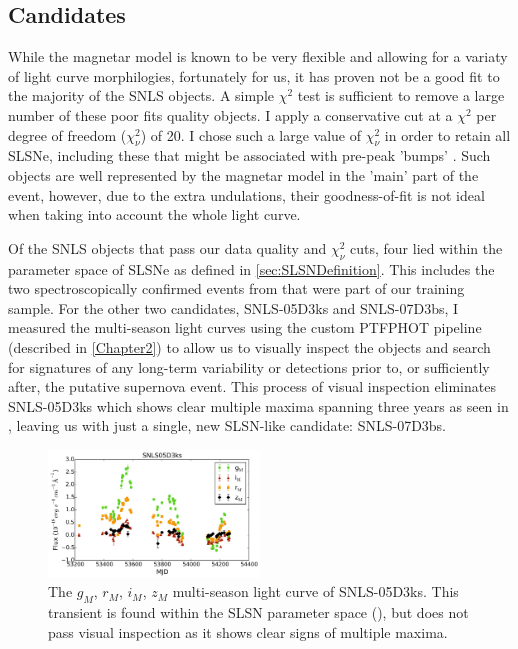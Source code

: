 \subsection{Candidates}
\label{sec:SLSNCands}
While the magnetar model is known to be very flexible and allowing for a variaty of light curve morphilogies, fortunately for us, it has proven not be a good fit to the majority of the SNLS objects. A simple $\chi^2$ test is sufficient to remove a large number of these poor fits quality objects. I apply a conservative cut at a $\chi^2$ per degree of freedom ($\chi^2_{\nu}$) of 20. I chose such a large value of $\chi^2_{\nu}$ in order to retain all SLSNe, including these that might be associated with pre-peak 'bumps' \citep{Nicolls2016,Nicolls2015a,Smith2016}. Such objects are well represented by the magnetar model in the 'main' part of the event, however, due to the extra undulations, their goodness-of-fit is not ideal when taking into account the whole light curve.

Of the SNLS objects that pass our data quality and $\chi^2_{\nu}$ cuts, four lied within the parameter space of SLSNe as defined in \ref{sec:SLSNDefinition}. This includes the two spectroscopically confirmed events from \citet{Howell2013} that were part of our training sample. For the other two candidates, SNLS-05D3ks and SNLS-07D3bs, I  measured the multi-season light curves using the custom \textsc{PTFPHOT} pipeline (described in \cref{Chapter2}) to allow us to visually inspect the objects and search for signatures of any long-term variability or detections prior to, or sufficiently after, the putative supernova event. This process of visual inspection eliminates SNLS-05D3ks which shows clear multiple maxima spanning three years as seen in , leaving us with just a single, new SLSN-like candidate: SNLS-07D3bs.

\begin{figure}
\centering
\includegraphics[width=0.5\textwidth]{Figures/Chapter3/SNLS05D3ks}
\caption{The $g_M$, $r_M$, $i_M$, $z_M$ multi-season light curve of SNLS-05D3ks. This transient is found within the SLSN parameter space (), but does not pass visual inspection as it shows clear signs of multiple maxima.}
\label{fig:05D3ks}
\end{figure}


